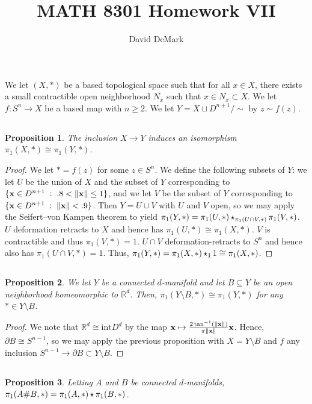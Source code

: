 \documentclass[english]{article}
\title{MATH 8301 Homework VII}
\author{David DeMark}
\date{\due}
\renewcommand\vec{\mathbf}
\DeclarePairedDelimiter\norm{\lVert}{\rVert}%
\newcommand{\RR}{\mathbb{R}}
\newcommand{\prob}[1]{\setcounter{section}{#1-1}\section{}}
\newcommand{\prt}[1]{\setcounter{subsection}{#1-1}\subsection{}}
\newtheorem*{proposition*}{Proposition}
\theoremstyle{remark}
\theoremstyle{definition}
\newcommand{\intr}{\mathrm{int}}
\newcommand{\frp}{\mathop{\large {\mathlarger{\star}}}}
\newcommand{\bdy}{\partial}
\begin{document}
	\maketitle
	\prob{1}
	We let $(X,*)$ be a based topological space such that
	for all $x\in X$, there exists a small contractible open neighborhood $N_x$ such that $x\in N_x\subset X$. We let $f:S^n\to X$ be a based map with $n\geq 2$. We let $Y=X\sqcup D^{n+1}/\sim$ by $z\sim f(z)$.
	\prt{1} \begin{proposition*}
		The inclusion $X\to Y$ induces an isomorphism $\pi_1(X,*)\cong \pi_1(Y,*)$.
	\end{proposition*}  
	\begin{proof} We let $*=f(z)$ for some $z\in S^n$. 
		We define the following subsets of $Y$: we let $U$ be the union of $X$ and the subset of $Y$ corresponding to $\{\vec{x}\in D^{n+1}\;:\; .8<\norm{\vec{x}}\leq 1\}$, and we let $V$ be the subset of $Y$ corresponding to $\{\vec{x}\in D^{n+1}\;:\;\norm{\vec{x}}<.9\}$. Then $Y=U\cup V$ with $U$ and $V$ open, so we may apply the Seifert--von Kampen theorem to yield $\pi_1(Y,*)=\pi_1(U,*)\frp_{\pi_1(U\cap V,*)}\pi_1(V,*)$. $U$ deformation retracts to $X$ and hence has $\pi_1(U,*)\cong \pi_1(X,*)$. $V$ is contractible and thus $\pi_1(V,*)=1$. $U\cap V$ deformation-retracts to $S^n$ and hence also has $\pi_1(U\cap V,*)=1$. Thus, $\pi_1(Y,*)=\pi_1(X,*)\frp_{1}1\cong \pi_1(X,*)$.
	\end{proof}
	\prt{2}
	\begin{proposition*}
		We let $Y$ be a connected $d$-manifold and let $B\subseteq Y$ be an open neighborhood homeomorphic to $\RR^d$. Then, $\pi_1(Y\setminus B,*)\cong \pi_1(Y,*)$ for any $*\in Y\setminus B$. 
	\end{proposition*}\begin{proof}
		We note that $\RR^d\cong \intr D^d$ by the map $\vec{x}\mapsto \frac{2\tan^{-1}(\norm{\vec{x}})}{\pi\norm{\vec{x}}}\vec{x}$. Hence, $\bdy B\cong S^{n-1}$, so we may apply the previous proposition with $X=Y\setminus B$ and $f$ any inclusion $S^{n-1}\to \bdy B\subset Y\setminus B$. 
	\end{proof}
	\prt{3}
	\begin{proposition*}
		Letting $A$ and $B$ be connected $d$-manifolds, $\pi_1(A\# B,*)=\pi_1(A,*)\frp \pi_1(B,*)$.
		
	\end{proposition*}
\end{document}
